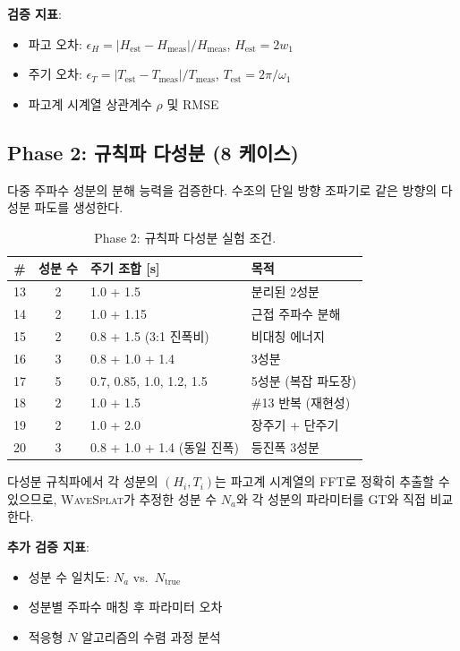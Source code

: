 \documentclass[11pt]{report}
\numberwithin{equation}{chapter}
\numberwithin{figure}{chapter}
\numberwithin{table}{chapter}
\newcommand{\WS}{\textsc{WaveSplat}}
\begin{document}
\textbf{검증 지표}:
\begin{itemize}
  \item 파고 오차: $\epsilon_H = |H_{\text{est}} - H_{\text{meas}}| / H_{\text{meas}}$,
        $H_{\text{est}} = 2w_1$
  \item 주기 오차: $\epsilon_T = |T_{\text{est}} - T_{\text{meas}}| / T_{\text{meas}}$,
        $T_{\text{est}} = 2\pi/\omega_1$
  \item 파고계 시계열 상관계수 $\rho$ 및 RMSE
\end{itemize}

\subsection{Phase 2: 규칙파 다성분 (8 케이스)}
\label{sec:tank_phase2}

다중 주파수 성분의 분해 능력을 검증한다.
수조의 단일 방향 조파기로 같은 방향의 다성분 파도를 생성한다.

\begin{table}[H]
\centering
\caption{Phase 2: 규칙파 다성분 실험 조건.}
\label{tab:tank_phase2}
\begin{tabular}{ccll}
\toprule
\# & 성분 수 & 주기 조합 [s] & 목적 \\
\midrule
13 & 2 & 1.0 + 1.5 & 분리된 2성분 \\
14 & 2 & 1.0 + 1.15 & 근접 주파수 분해 \\
15 & 2 & 0.8 + 1.5 (3:1 진폭비) & 비대칭 에너지 \\
16 & 3 & 0.8 + 1.0 + 1.4 & 3성분 \\
17 & 5 & 0.7, 0.85, 1.0, 1.2, 1.5 & 5성분 (복잡 파도장) \\
18 & 2 & 1.0 + 1.5 & \#13 반복 (재현성) \\
19 & 2 & 1.0 + 2.0 & 장주기 + 단주기 \\
20 & 3 & 0.8 + 1.0 + 1.4 (동일 진폭) & 등진폭 3성분 \\
\bottomrule
\end{tabular}
\end{table}

다성분 규칙파에서 각 성분의 $(H_i, T_i)$는 파고계 시계열의 FFT로 정확히 추출할 수 있으므로,
\WS{}가 추정한 성분 수 $N_a$와 각 성분의 파라미터를
GT와 직접 비교한다.

\textbf{추가 검증 지표}:
\begin{itemize}
  \item 성분 수 일치도: $N_a$ vs.\ $N_{\text{true}}$
  \item 성분별 주파수 매칭 후 파라미터 오차
  \item 적응형 $N$ 알고리즘의 수렴 과정 분석
\end{itemize}
\end{document}
